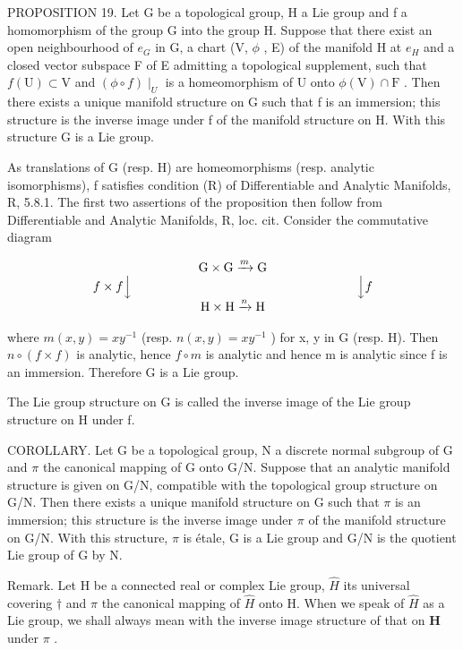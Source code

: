PROPOSITION 19. Let G be a topological group, H a Lie group and f a homomorphism of the group G into the group H. Suppose that there exist an open neighbourhood of \(e_{G}\) in G, a chart (V, \(\phi\) , E) of the manifold H at \(e_{H}\) and a closed vector subspace F of E admitting a topological supplement, such that \(f(\mathrm{U}) \subset \mathrm{V}\) and \((\phi \circ f)\mid_U\) is a homeomorphism of U onto \(\phi(\mathrm{V}) \cap \mathrm{F}\) . Then there exists a unique manifold structure on G such that f is an immersion; this structure is the inverse image under f of the manifold structure on H. With this structure G is a Lie group.

As translations of G (resp. H) are homeomorphisms (resp. analytic isomorphisms), f satisfies condition (R) of Differentiable and Analytic Manifolds, R, 5.8.1. The first two assertions of the proposition then follow from Differentiable and Analytic Manifolds, R, loc. cit. Consider the commutative diagram

\[
\begin{array}{c} \mathrm{G} \times \mathrm{G} \xrightarrow {m} \mathrm{G} \\ f \times f \Big \downarrow \qquad \qquad \qquad \qquad \qquad \qquad \qquad \qquad \qquad \Big \downarrow f \\ \mathrm{H} \times \mathrm{H} \xrightarrow {n} \mathrm{H} \end{array}
\]

where \(m(x,y)=xy^{-1}\) (resp. \(n(x,y)=xy^{-1}\) ) for x, y in G (resp. H). Then \(n\circ(f\times f)\) is analytic, hence \(f\circ m\) is analytic and hence m is analytic since f is an immersion. Therefore G is a Lie group.

The Lie group structure on G is called the inverse image of the Lie group structure on H under f.

COROLLARY. Let G be a topological group, N a discrete normal subgroup of G and \(\pi\) the canonical mapping of G onto G/N. Suppose that an analytic manifold structure is given on G/N, compatible with the topological group structure on G/N. Then there exists a unique manifold structure on G such that \(\pi\) is an immersion; this structure is the inverse image under \(\pi\) of the manifold structure on G/N. With this structure, \(\pi\) is étale, G is a Lie group and G/N is the quotient Lie group of G by N.

Remark. Let H be a connected real or complex Lie group, \(\hat{H}\) its universal covering \(\dagger\) and \(\pi\) the canonical mapping of \(\hat{H}\) onto H. When we speak of \(\hat{H}\) as a Lie group, we shall always mean with the inverse image structure of that on \(\mathbf{H}\) under \(\pi\) .

